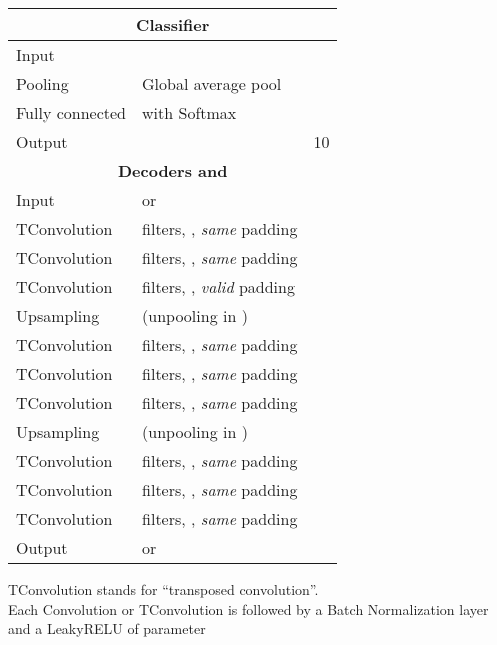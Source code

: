 \documentclass[runningheads]{llncs}
\begin{document}
\begin{table}[htbp]
\begin{threeparttable}
\begin{tabular}{ l l l}
\toprule
\multicolumn{3}{c}{\textbf{Classifier }}\\
\midrule
Input & &  \\
Pooling & Global average pool &  \\
Fully connected & with Softmax &  \\
Output &  & 10 \\
\toprule
\multicolumn{3}{c}{\textbf{Decoders  and }}\\
\midrule
Input &  or  &  \\
TConvolution &  filters, , \textit{same} padding  &  \\
TConvolution &  filters, , \textit{same} padding  &  \\
TConvolution &  filters, , \textit{valid} padding  &  \\
Upsampling   &  (unpooling in )  &  \\
TConvolution &  filters, , \textit{same} padding &  \\
TConvolution &  filters, , \textit{same} padding &  \\
TConvolution &  filters, , \textit{same} padding &  \\
Upsampling &  (unpooling in ) &  \\
TConvolution &  filters, , \textit{same} padding  &  \\
TConvolution &  filters, , \textit{same} padding  &  \\
TConvolution &  filters, , \textit{same} padding  &  \\
Output &  or  &  \\
\bottomrule
\end{tabular}
\begin{tablenotes}
TConvolution stands for ``transposed convolution''.\\ Each Convolution or TConvolution is followed by a Batch Normalization layer and a LeakyRELU of parameter 
\end{tablenotes}
\end{threeparttable}
\end{table}
\end{document}
